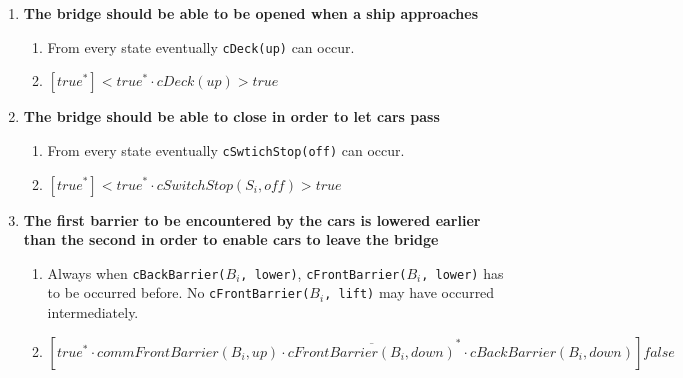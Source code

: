\begin{enumerate}
	\item \textbf{The bridge should be able to be opened when a ship approaches}
	\begin{enumerate}
		\item From every state eventually \texttt{cDeck(up)} can occur.
		\item $[true^*]<true^* \cdot cDeck(up)>true$
	\end{enumerate}

	\item \textbf{The bridge should be able to close in order to let cars pass}
	\begin{enumerate}
		\item From every state eventually \texttt{cSwtichStop(off)} can occur.
		\item $[true^*]<true^* \cdot cSwitchStop(S_i, off)>true$
	\end{enumerate}

	\item \textbf{The first barrier to be encountered by the cars is lowered earlier than the second in order to enable cars to leave the bridge}
	\begin{enumerate}
		\item Always when \texttt{cBackBarrier($B_i$, lower)}, \texttt{cFrontBarrier($B_i$, lower)} has to be occurred before. No \texttt{cFrontBarrier($B_i$, lift)} may have occurred intermediately.
		\item $[true^* \cdot commFrontBarrier(B_i, up) \cdot \overline{cFrontBarrier(B_i, down)}^{*} \cdot cBackBarrier(B_i, down)]false$\\
	\end{enumerate}



\end{enumerate}

\newpage
